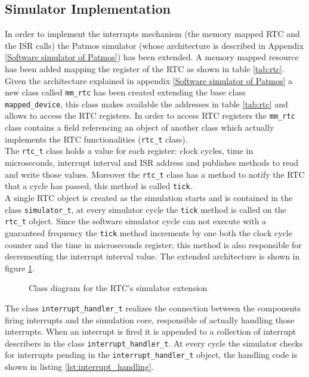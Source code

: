 \subsection{Simulator Implementation}

In order to implement the interrupts mechanism (the memory mapped RTC and the ISR calls) the Patmos simulator (whose architecture is described in Appendix \ref{Software simulator of Patmos}) has been extended. A memory mapped resource has been added mapping the register of the RTC as shown in table \ref{tab:rtc}. Given the architecture explained in appendix \ref{Software simulator of Patmos} a new class called \texttt{mm\_rtc} has been created extending the base class \texttt{mapped\_device}, this class makes available the addresses in table \ref{tab:rtc} and allows to access the RTC registers. In order to access RTC registers the \texttt{mm\_rtc} class contains a field referencing an object of another class which actually implements the RTC functionalities (\texttt{rtc\_t} class).\\

The \texttt{rtc\_t} class holds a value for each register: clock cycles, time in microseconds, interrupt interval and ISR address and publishes methods to read and write those values. Moreover the \texttt{rtc\_t} class has a method to notify the RTC that a cycle has passed, this method is called \texttt{tick}.\\

A single RTC object is created as the simulation starts and is contained in the class \texttt{simulator\_t}, at every simulator cycle the \texttt{tick} method is called on the \texttt{rtc\_t} object. Since the software simulator cycle can not execute with a guaranteed frequency the \texttt{tick} method increments by one both the clock cycle counter and the time in microseconds register; this method is also responsible for decrementing the interrupt interval value. The extended architecture is shown in figure \ref{simulator_RTC_class_diagram}.

	\begin{figure}[!ht]
		\begin{center}
		\end{center}
		\caption{Class diagram for the RTC's simulator extension}
		\label{simulator_RTC_class_diagram}
	\end{figure}

The class \texttt{interrupt\_handler\_t} realizes the connection between the components firing interrupts and the simulation core, responsible of actually handling those interrupts. When an interrupt is fired it is appended to a collection of interrupt describers in the class \texttt{interrupt\_handler\_t}. At every cycle the simulator checks for interrupts pending in the \texttt{interrupt\_handler\_t} object, the handling code is shown in listing \ref{lst:interrupt_handling}.\\

